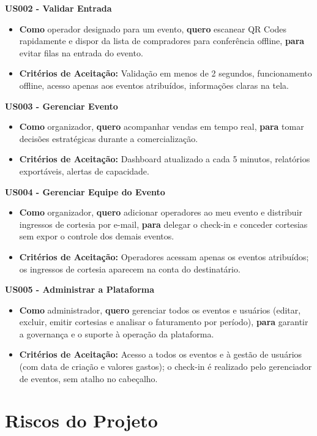\textbf{US002 - Validar Entrada}
\begin{itemize}
    \item \textbf{Como} operador designado para um evento, \textbf{quero} escanear QR Codes rapidamente e dispor da lista de compradores para conferência offline, \textbf{para} evitar filas na entrada do evento.
    \item \textbf{Critérios de Aceitação:} Validação em menos de 2 segundos, funcionamento offline, acesso apenas aos eventos atribuídos, informações claras na tela.
\end{itemize}

\textbf{US003 - Gerenciar Evento}
\begin{itemize}
    \item \textbf{Como} organizador, \textbf{quero} acompanhar vendas em tempo real, \textbf{para} tomar decisões estratégicas durante a comercialização.
    \item \textbf{Critérios de Aceitação:} Dashboard atualizado a cada 5 minutos, relatórios exportáveis, alertas de capacidade.
\end{itemize}

\textbf{US004 - Gerenciar Equipe do Evento}
\begin{itemize}
    \item \textbf{Como} organizador, \textbf{quero} adicionar operadores ao meu evento e distribuir ingressos de cortesia por e-mail, \textbf{para} delegar o check-in e conceder cortesias sem expor o controle dos demais eventos.
    \item \textbf{Critérios de Aceitação:} Operadores acessam apenas os eventos atribuídos; os ingressos de cortesia aparecem na conta do destinatário.
\end{itemize}

\textbf{US005 - Administrar a Plataforma}
\begin{itemize}
    \item \textbf{Como} administrador, \textbf{quero} gerenciar todos os eventos e usuários (editar, excluir, emitir cortesias e analisar o faturamento por período), \textbf{para} garantir a governança e o suporte à operação da plataforma.
    \item \textbf{Critérios de Aceitação:} Acesso a todos os eventos e à gestão de usuários (com data de criação e valores gastos); o check-in é realizado pelo gerenciador de eventos, sem atalho no cabeçalho.
\end{itemize}

\section{Riscos do Projeto}

